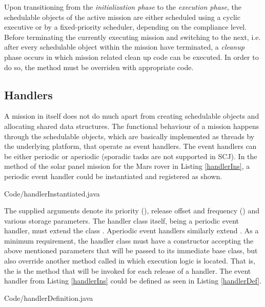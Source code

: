 Upon transitioning from the \textit{initialization phase} to the \textit{execution phase}, the schedulable objects of the active mission are either scheduled using a cyclic executive or by a fixed-priority scheduler, depending on the compliance level. Before terminating the currently executing mission and switching to the next, i.e. after every schedulable object within the mission have terminated, a \textit{cleanup} phase occurs in which mission related clean up code can be executed. In order to do so, the  method must be overriden with appropriate code.

\subsection{Handlers}
\label{subsection:handlers}
A mission in itself does not do much apart from creating schedulable objects and allocating shared data structures. The functional behaviour of a mission happens through the schedulable objects, which are basically implemented as threads by the underlying platform, that operate as event handlers. The event handlers can be either periodic or aperiodic (sporadic tasks are not supported in SCJ). In the  method of the solar panel mission for the Mars rover in Listing \ref{handlerIns}, a periodic event handler could be instantiated and registered as shown.


{Code/handlerInstantiated.java}

The supplied arguments denote its priority (), release offset and frequency () and various storage parameters. The handler class itself, being a periodic event handler, must extend the class . Aperiodic event handlers similarly extend . As a minimum requirement, the handler class must have a constructor accepting the above mentioned parameters that will be passed to its immediate base class, but also override another method called  in which execution logic is located. That is, the  is the method that will be invoked for each release of a handler. The  event handler from Listing \ref{handlerIns} could be defined as seen in Listing \ref{handlerDef}.


{Code/handlerDefinition.java}

